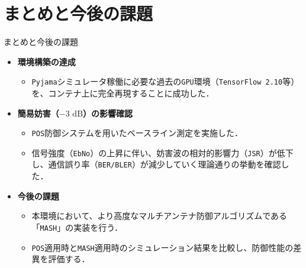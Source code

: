 \documentclass[11pt, aspectratio=169]{beamer}
\begin{document}
\section{まとめと今後の課題}

\begin{frame}{まとめと今後の課題}
  \begin{itemize}
    \item \textbf{環境構築の達成}
    \begin{itemize}
      \item \texttt{Pyjama}シミュレータ稼働に必要な過去の\texttt{GPU}環境（\texttt{TensorFlow 2.10}等）を、コンテナ上に完全再現することに成功した．
    \end{itemize}
    \item \textbf{簡易妨害（$-3\text{ dB}$）の影響確認}
    \begin{itemize}
      \item \texttt{POS}防御システムを用いたベースライン測定を実施した．
      \item 信号強度（\texttt{EbNo}）の上昇に伴い、妨害波の相対的影響力（\texttt{JSR}）が低下し、通信誤り率（\texttt{BER/BLER}）が減少していく理論通りの挙動を確認した．
    \end{itemize}
    \item \textbf{今後の課題}
    \begin{itemize}
      \item 本環境において、より高度なマルチアンテナ防御アルゴリズムである「\texttt{MASH}」の実装を行う．
      \item \texttt{POS}適用時と\texttt{MASH}適用時のシミュレーション結果を比較し、防御性能の差異を評価する．
    \end{itemize}
  \end{itemize}
\end{frame}
\end{document}
